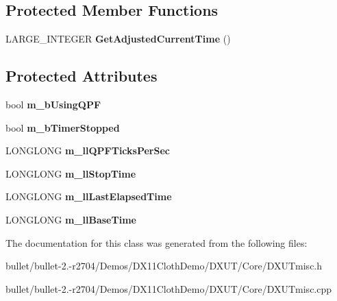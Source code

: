 \subsection*{Protected Member Functions}
\begin{DoxyCompactItemize}
\item 
\hypertarget{class_c_d_x_u_t_timer_ae3e30ee1953d922c42dae96088b5842f}{L\+A\+R\+G\+E\+\_\+\+I\+N\+T\+E\+G\+E\+R {\bfseries Get\+Adjusted\+Current\+Time} ()}\label{class_c_d_x_u_t_timer_ae3e30ee1953d922c42dae96088b5842f}

\end{DoxyCompactItemize}
\subsection*{Protected Attributes}
\begin{DoxyCompactItemize}
\item 
\hypertarget{class_c_d_x_u_t_timer_a7ddec5a794d4bc2cf35c8139dcaf77cf}{bool {\bfseries m\+\_\+b\+Using\+Q\+P\+F}}\label{class_c_d_x_u_t_timer_a7ddec5a794d4bc2cf35c8139dcaf77cf}

\item 
\hypertarget{class_c_d_x_u_t_timer_ab6969b767724f796674c46618a9cef34}{bool {\bfseries m\+\_\+b\+Timer\+Stopped}}\label{class_c_d_x_u_t_timer_ab6969b767724f796674c46618a9cef34}

\item 
\hypertarget{class_c_d_x_u_t_timer_a5d02af56056a52900a24a0b2a4890ebd}{L\+O\+N\+G\+L\+O\+N\+G {\bfseries m\+\_\+ll\+Q\+P\+F\+Ticks\+Per\+Sec}}\label{class_c_d_x_u_t_timer_a5d02af56056a52900a24a0b2a4890ebd}

\item 
\hypertarget{class_c_d_x_u_t_timer_ad27f97d31ae946f1c0b55ddaa11902cb}{L\+O\+N\+G\+L\+O\+N\+G {\bfseries m\+\_\+ll\+Stop\+Time}}\label{class_c_d_x_u_t_timer_ad27f97d31ae946f1c0b55ddaa11902cb}

\item 
\hypertarget{class_c_d_x_u_t_timer_a9dc6f56a2fddb4c275d33ca8858f2367}{L\+O\+N\+G\+L\+O\+N\+G {\bfseries m\+\_\+ll\+Last\+Elapsed\+Time}}\label{class_c_d_x_u_t_timer_a9dc6f56a2fddb4c275d33ca8858f2367}

\item 
\hypertarget{class_c_d_x_u_t_timer_ab756323e5a37b91a5eab6275a27a734a}{L\+O\+N\+G\+L\+O\+N\+G {\bfseries m\+\_\+ll\+Base\+Time}}\label{class_c_d_x_u_t_timer_ab756323e5a37b91a5eab6275a27a734a}

\end{DoxyCompactItemize}


The documentation for this class was generated from the following files\+:\begin{DoxyCompactItemize}
\item 
bullet/bullet-\/2.-\/r2704/\+Demos/\+D\+X11\+Cloth\+Demo/\+D\+X\+U\+T/\+Core/D\+X\+U\+Tmisc.\+h\item 
bullet/bullet-\/2.-\/r2704/\+Demos/\+D\+X11\+Cloth\+Demo/\+D\+X\+U\+T/\+Core/D\+X\+U\+Tmisc.\+cpp\end{DoxyCompactItemize}
